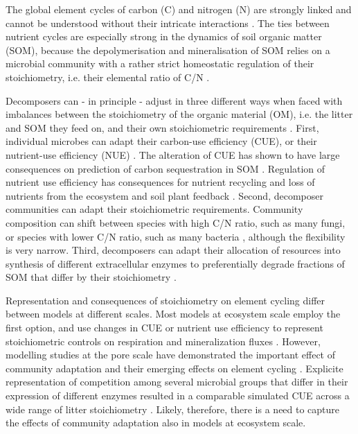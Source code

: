 
\introduction 
The global element cycles of carbon (C) and nitrogen (N) are strongly linked
and cannot be understood without their intricate interactions 
\citep{Thornton07,Janssens10, Zaehle11}. 
The ties between nutrient cycles are especially strong
in the dynamics of soil organic matter (SOM), because the depolymerisation and mineralisation of SOM relies on a microbial community with a rather strict homeostatic regulation of their stoichiometry, i.e. their elemental ratio of C/N \citep{Sterner02, Zechmeister15}.

 
Decomposers can - in principle - adjust in three different ways when faced with imbalances between the stoichiometry of the organic material (OM), i.e. the litter and SOM they
feed on, and their own stoichiometric requirements \citep{Mooshammer14}.
First, individual microbes can adapt their carbon-use efficiency (CUE), or their nutrient-use
efficiency (NUE) \citep{Sinsabaugh13}. The alteration of CUE has shown to have
large consequences on prediction of carbon sequestration in SOM
\citep{Allison14a, Wieder13}.
Regulation of nutrient use efficiency has consequences for nutrient recycling and loss of nutrients
from the ecosystem \citep{Mooshammer14a} and soil plant feedback
\citep{Rastetter11}.
Second, decomposer communities can adapt their stoichiometric
requirements. Community composition can shift between species with high C/N
ratio, such as many fungi, or species with lower C/N ratio, such as many
bacteria \citep{Cleveland07, Xu13}, although the flexibility is very narrow.
Third, decomposers can adapt their allocation of resources into
synthesis of different extracellular enzymes to preferentially degrade
fractions of SOM that differ by their stoichiometry \citep{Moorhead12}.

Representation and consequences of stoichiometry on element cycling differ
between models at different scales. Most models at ecosystem scale employ the
first option, and use changes in CUE or nutrient use efficiency to represent stoichiometric controls
on respiration and mineralization fluxes \citep{Manzoni08}. However, modelling
studies at the pore scale have demonstrated the important effect of community
adaptation and their emerging effects on element cycling \citep{Allison05,
Resat11, Wang13}. Explicite representation of competition among several
microbial groups that differ in their expression of different enzymes resulted in a
comparable simulated CUE across a wide range of litter stoichiometry
\citep{Kaiser14}. Likely, therefore, there is a need to capture the effects of
community adaptation also in models at ecosystem scale.

